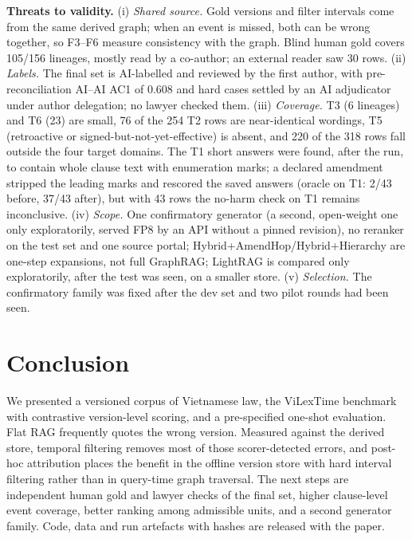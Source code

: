 \documentclass[conference]{IEEEtran}
\newcommand{\sys}[1]{\textsf{#1}}
\begin{document}
\textbf{Threats to validity.} (i) \emph{Shared source.} Gold versions and filter intervals come from the same derived graph; when an event is missed, both can be wrong together, so F3--F6 measure consistency with the graph. Blind human gold covers 105/156 lineages, mostly read by a co-author; an external reader saw 30 rows. (ii) \emph{Labels.} The final set is AI-labelled and reviewed by the first author, with pre-reconciliation AI--AI AC1 of 0.608 and hard cases settled by an AI adjudicator under author delegation; no lawyer checked them. (iii) \emph{Coverage.} T3 (6 lineages) and T6 (23) are small, 76 of the 254 T2 rows are near-identical wordings, T5 (retroactive or signed-but-not-yet-effective) is absent, and 220 of the 318 rows fall outside the four target domains. The T1 short answers were found, after the run, to contain whole clause text with enumeration marks; a declared amendment stripped the leading marks and rescored the saved answers (oracle on T1: 2/43 before, 37/43 after), but with 43 rows the no-harm check on T1 remains inconclusive. (iv) \emph{Scope.} One confirmatory generator (a second, open-weight one only exploratorily, served FP8 by an API without a pinned revision), no reranker on the test set and one source portal; \sys{Hybrid+AmendHop}/\sys{Hybrid+Hierarchy} are one-step expansions, not full GraphRAG; LightRAG is compared only exploratorily, after the test was seen, on a smaller store. (v) \emph{Selection.} The confirmatory family was fixed after the dev set and two pilot rounds had been seen.

\section{Conclusion}
\label{sec:conclusion}

We presented a versioned corpus of Vietnamese law, the ViLexTime benchmark with contrastive version-level scoring, and a pre-specified one-shot evaluation. Flat RAG frequently quotes the wrong version. Measured against the derived store, temporal filtering removes most of those scorer-detected errors, and post-hoc attribution places the benefit in the offline version store with hard interval filtering rather than in query-time graph traversal. The next steps are independent human gold and lawyer checks of the final set, higher clause-level event coverage, better ranking among admissible units, and a second generator family. Code, data and run artefacts with hashes are released with the paper.
\end{document}

